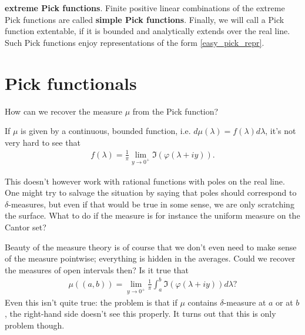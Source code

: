 \textbf{extreme Pick functions}. Finite positive linear combinations of the extreme Pick functions are called \textbf{simple Pick functions}. Finally, we will call a Pick function extentable, if it is bounded and analytically extends over the real line. Such Pick functions enjoy representations of the form \ref{easy_pick_repr}.
\section{Pick functionals}

\begin{quest}
	How can we recover the measure $\mu$ from the Pick function?
\end{quest}

If $\mu$ is given by a continuous, bounded function, i.e. $d \mu(\lambda) = f(\lambda) d \lambda$, it's not very hard to see that
\begin{align*}
	f(\lambda) = \frac{1}{\pi}\lim_{y \to 0^{+}} \Im(\varphi(\lambda + i y)).
\end{align*}

This doesn't however work with rational functions with poles on the real line. One might try to salvage the situation by saying that poles should correspond to $\delta$-measures, but even if that would be true in some sense, we are only scratching the surface. What to do if the measure is for instance the uniform measure on the Cantor set?

Beauty of the measure theory is of course that we don't even need to make sense of the measure pointwise; everything is hidden in the averages. Could we recover the measures of open intervals then? Is it true that
\begin{align*}
	\mu((a, b)) = \lim_{y \to 0^{+}}\frac{1}{\pi}\int_{a}^{b} \Im(\varphi(\lambda + i y)) d \lambda?
\end{align*}
Even this isn't quite true: the problem is that if $\mu$ contains $\delta$-measure at $a$ or at $b$, the right-hand side doesn't see this properly. It turns out that this is only problem though.

